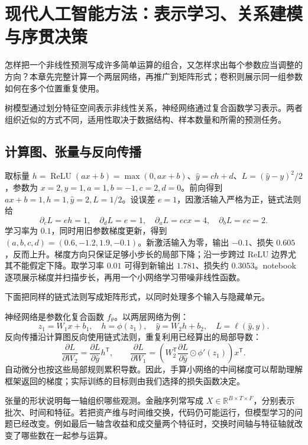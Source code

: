 \chapter{现代人工智能方法：表示学习、关系建模与序贯决策}
\label{ch:lower-ml-deep}

怎样把一个非线性预测写成许多简单运算的组合，又怎样求出每个参数应当调整的方向？本章先完整计算一个两层网络，再推广到矩阵形式；卷积则展示同一组参数如何在多个位置重复使用。

树模型通过划分特征空间表示非线性关系，神经网络通过复合函数学习表示。两者组织近似的方式不同，适用性取决于数据结构、样本数量和所需的预测任务。

\section{计算图、张量与反向传播}

取标量 $h=\operatorname{ReLU}(ax+b)=\max(0,ax+b)$、$\hat y=ch+d$、$L=(\hat y-y)^2/2$，参数为 $x=2,y=1,a=1,b=-1,c=2,d=0$。前向得到 $ax+b=1,h=1,\hat y=2,L=1/2$。设误差 $e=1$，因激活输入严格为正，链式法则给
\[
 \partial_cL=eh=1,\quad \partial_dL=e=1,\quad
 \partial_aL=ecx=4,\quad \partial_bL=ec=2.
\]
学习率为 $0.1$，同时用旧参数梯度更新，得到 $(a,b,c,d)=(0.6,-1.2,1.9,-0.1)$。新激活输入为零，输出 $-0.1$、损失 $0.605$，反而上升。梯度方向只保证足够小步长的局部下降；沿一步跨过 ReLU 边界尤其不能假定下降。取学习率 $0.01$ 可得到新输出 $1.781$、损失约 $0.3053$。notebook 逐项展示梯度并扫描步长，再用一个小网络学习带噪非线性函数。

下面把同样的链式法则写成矩阵形式，以同时处理多个输入与隐藏单元。

神经网络是参数化复合函数 $f_\theta$。以两层网络为例：
\[
z_1=W_1x+b_1,\quad h=\phi(z_1),\quad
\hat y=W_2h+b_2,\quad
L=\ell(\hat y,y).
\]
反向传播沿计算图反向使用链式法则，重复利用已经算出的局部导数：
\[
\frac{\partial L}{\partial W_2}
=\frac{\partial L}{\partial\hat y}h^{\mathsf T},
\qquad
\frac{\partial L}{\partial W_1}
=\left(W_2^{\mathsf T}\frac{\partial L}{\partial\hat y}
\odot\phi'(z_1)\right)x^{\mathsf T}.
\]
自动微分也按这些局部规则累积导数。因此，手算小网络的中间梯度可以帮助理解框架返回的梯度；实际训练的目标则由我们选择的损失函数决定。

张量的形状说明每一轴组织哪些观测。金融序列常写成 $X\in\mathbb R^{B\times T\times F}$，分别表示批次、时间和特征。若把资产维与时间维交换，代码仍可能运行，但模型学习的问题已经改变。例如最后一轴含收益和成交量两个特征时，交换时间轴与特征轴就改变了哪些数在一起参与运算。

